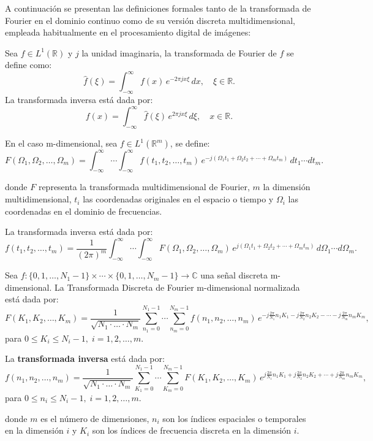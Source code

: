 A continuación se presentan las definiciones formales tanto de la transformada de Fourier en el dominio continuo como de su versión discreta multidimensional, empleada habitualmente en el procesamiento digital de imágenes:

\begin{definicion}
Sea \( f \in L^1(\mathbb{R}) \) y $j$ la unidad imaginaria, la transformada de Fourier de \( f \) se define como:
\[
\hat{f}(\xi) = \int_{-\infty}^{\infty} f(x)\, e^{-2\pi j x \xi} \, dx, \quad \xi \in \mathbb{R}.
\]
La transformada inversa está dada por:
\[
f(x) = \int_{-\infty}^{\infty} \hat{f}(\xi)\, e^{2\pi j x \xi} \, d\xi, \quad x \in \mathbb{R}.
\]

En el caso m-dimensional, sea \( f \in L^1(\mathbb{R}^m) \), se define:
\[
F(\Omega_1, \Omega_2, \ldots, \Omega_m) = \int_{-\infty}^{\infty} \cdots \int_{-\infty}^{\infty} f(t_1, t_2, \ldots, t_m)\, e^{-j(\Omega_1 t_1 + \Omega_2 t_2 + \cdots + \Omega_m t_m)}\, dt_1 \cdots dt_m.
\]

donde $F$ representa la transformada multidimensional de Fourier, $m$ la dimensión multidimensional, $t_i$ las coordenadas originales en el espacio o tiempo y $\Omega_i$ las coordenadas en el dominio de frecuencias.

La transformada inversa está dada por:
\[
f(t_1, t_2, \ldots, t_m) = \frac{1}{(2\pi)^m} \int_{-\infty}^{\infty} \cdots \int_{-\infty}^{\infty} F(\Omega_1, \Omega_2, \ldots, \Omega_m)\, e^{j(\Omega_1 t_1 + \Omega_2 t_2 + \cdots + \Omega_m t_m)}\, d\Omega_1 \cdots d\Omega_m.
\]
\end{definicion}

\begin{definicion}

Sea \( f : \{0, 1, \ldots, N_1 - 1\} \times \cdots \times \{0, 1, \ldots, N_m - 1\} \to \mathbb{C} \) una señal discreta m-dimensional. La Transformada Discreta de Fourier m-dimensional normalizada está dada por:
\[
F(K_1, K_2, \ldots, K_m) = \frac{1}{\sqrt{N_1 \cdot \ldots \cdot N_m}} \sum_{n_1=0}^{N_1-1} \cdots \sum_{n_m=0}^{N_m-1} f(n_1, n_2, \ldots, n_m) \, e^{-j \frac{2\pi}{N_1} n_1 K_1 - j\frac{2\pi}{N_2} n_2 K_2 - \cdots - j \frac{2\pi}{N_m} n_m K_m},
\]
para \( 0 \leq K_i \leq N_i -1, \; i=1,2,\ldots,m. \)

La \textbf{transformada inversa} está dada por:
\[
f(n_1, n_2, \ldots, n_m) = \frac{1}{\sqrt{N_1 \cdot \ldots \cdot N_m}} \sum_{K_1=0}^{N_1-1} \cdots \sum_{K_m=0}^{N_m-1} F(K_1, K_2, \ldots, K_m) \, e^{j \frac{2\pi}{N_1} n_1 K_1 + j \frac{2\pi}{N_2} n_2 K_2 + \cdots + j \frac{2\pi}{N_m} n_m K_m},
\]
para \( 0 \leq n_i \leq N_i -1, \; i=1,2,\ldots,m. \)


donde \( m \) es el número de dimensiones, \( n_i \) son los índices espaciales o temporales en la dimensión \( i \) y \( K_i \) son los índices de frecuencia discreta en la dimensión \( i \).
\end{definicion}



